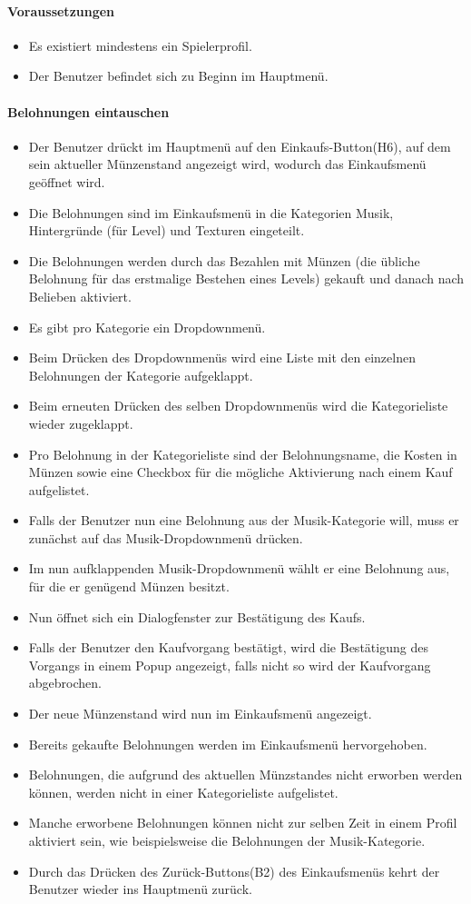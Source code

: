 \paragraph{Voraussetzungen}
\begin{itemize}
	\item Es existiert mindestens ein Spielerprofil.
	\item Der Benutzer befindet sich zu Beginn im Hauptmenü.
\end{itemize}
\paragraph{Belohnungen eintauschen}
\begin{itemize}
	\item Der Benutzer drückt im Hauptmenü auf den Einkaufs-Button(H6), auf dem sein aktueller Münzenstand angezeigt wird, wodurch das Einkaufsmenü geöffnet wird.
	\item Die Belohnungen sind im Einkaufsmenü in die Kategorien Musik, Hintergründe (für Level) und Texturen eingeteilt.
	\item Die Belohnungen werden durch das Bezahlen mit Münzen (die übliche Belohnung für das erstmalige Bestehen eines Levels) gekauft und danach nach Belieben aktiviert.
	\item Es gibt pro Kategorie ein Dropdownmenü.
	\item Beim Drücken des Dropdownmenüs wird eine Liste mit den einzelnen Belohnungen der Kategorie aufgeklappt.
	\item Beim erneuten Drücken des selben Dropdownmenüs wird die Kategorieliste wieder zugeklappt.
	\item Pro Belohnung in der Kategorieliste sind der Belohnungsname, die Kosten in Münzen sowie eine Checkbox für die mögliche Aktivierung nach einem Kauf aufgelistet.
	\item Falls der Benutzer nun eine Belohnung aus der Musik-Kategorie will, muss er zunächst auf das Musik-Dropdownmenü drücken.
	\item Im nun aufklappenden Musik-Dropdownmenü wählt er eine Belohnung aus, für die er genügend Münzen besitzt.
	\item Nun öffnet sich ein Dialogfenster zur Bestätigung des Kaufs.
	\item Falls der Benutzer den Kaufvorgang bestätigt, wird die Bestätigung des Vorgangs in einem Popup angezeigt, falls nicht so wird der Kaufvorgang abgebrochen.
	\item Der neue Münzenstand wird nun im Einkaufsmenü angezeigt.
	\item Bereits gekaufte Belohnungen werden im Einkaufsmenü hervorgehoben.
	\item Belohnungen, die aufgrund des aktuellen Münzstandes nicht erworben werden können, werden nicht in einer Kategorieliste aufgelistet.
	\item Manche erworbene Belohnungen können nicht zur selben Zeit in einem Profil aktiviert sein, wie beispielsweise die Belohnungen der Musik-Kategorie.
	\item Durch das Drücken des Zurück-Buttons(B2) des Einkaufsmenüs kehrt der Benutzer wieder ins Hauptmenü zurück.
\end{itemize}

